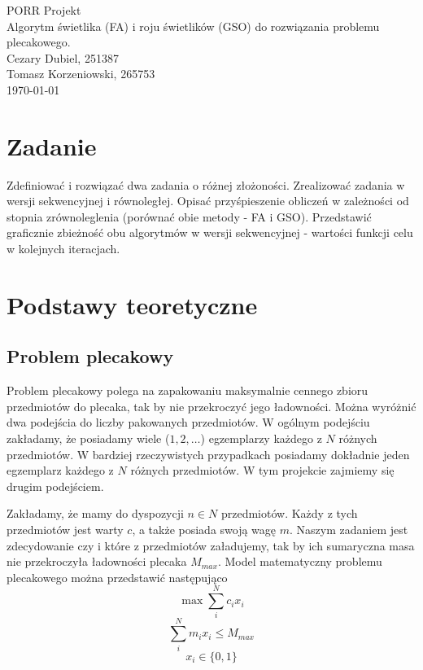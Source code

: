 \documentclass[11pt,a4paper,twoside]{article}
\begin{document}
\begin{center}
\vspace*{3\baselineskip}
{\LARGE{PORR Projekt}}
\\
\vspace*{1\baselineskip}
{\large{Algorytm świetlika (FA) i roju świetlików (GSO) do rozwiązania problemu plecakowego.}}
\\
\vspace*{1\baselineskip}
Cezary Dubiel, 251387\\
Tomasz Korzeniowski, 265753\\
\vspace*{1\baselineskip}
\today
\end{center}
\section{Zadanie}
Zdefiniować i rozwiązać dwa zadania o różnej złożoności. Zrealizować zadania w wersji sekwencyjnej i równoległej. Opisać przyśpieszenie obliczeń w zależności od stopnia zrównoleglenia (porównać obie metody - FA i GSO). Przedstawić graficznie zbieżność obu algorytmów w wersji sekwencyjnej - wartości funkcji celu w kolejnych iteracjach.
\section{Podstawy teoretyczne}
\subsection{Problem plecakowy}
Problem plecakowy polega na zapakowaniu maksymalnie cennego zbioru przedmiotów do plecaka, tak by nie przekroczyć jego ładowności. Można wyróżnić dwa podejścia do liczby pakowanych przedmiotów. W ogólnym podejściu zakładamy, że posiadamy wiele ($1, 2, \ldots$) egzemplarzy każdego z $N$ różnych przedmiotów. W bardziej rzeczywistych przypadkach posiadamy dokładnie jeden egzemplarz każdego z $N$ różnych przedmiotów. W tym projekcie zajmiemy się drugim podejściem.

Zakładamy, że mamy do dyspozycji $n \in N$ przedmiotów. Każdy z tych przedmiotów jest warty $c$, a także posiada swoją wagę $m$. Naszym zadaniem jest zdecydowanie czy i które z przedmiotów załadujemy, tak by ich sumaryczna masa nie przekroczyła ładowności plecaka $M_{max}$. Model matematyczny problemu plecakowego można przedstawić następująco
\begin{equation}
\max \sum_{i}^{N} c_{i} x_{i} 
\label{f_celu}
\end{equation}
\begin{equation}
\sum_{i}^{N} m_{i} x_{i} \leq M_{max}
\end{equation}
\begin{equation}
x_{i} \in \{0,1\}
\end{equation}
\end{document}
